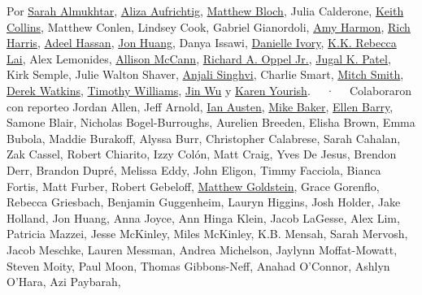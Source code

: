 Por \href{https://www.nytimes3xbfgragh.onion/by/sarah-almukhtar}{Sarah
Almukhtar},
\href{https://www.nytimes3xbfgragh.onion/by/aliza-aufrichtig}{Aliza
Aufrichtig},
\href{https://www.nytimes3xbfgragh.onion/by/matthew-bloch}{Matthew
Bloch}, Julia Calderone,
\href{https://www.nytimes3xbfgragh.onion/by/keith-collins}{Keith
Collins}, Matthew Conlen, Lindsey Cook, Gabriel Gianordoli,
\href{https://www.nytimes3xbfgragh.onion/by/amy-harmon}{Amy Harmon},
\href{https://www.nytimes3xbfgragh.onion/by/rich-harris}{Rich Harris},
\href{https://www.nytimes3xbfgragh.onion/by/adeel-hassan}{Adeel Hassan},
\href{https://www.nytimes3xbfgragh.onion/by/jon-huang}{Jon Huang}, Danya
Issawi,
\href{https://www.nytimes3xbfgragh.onion/by/danielle-ivory}{Danielle
Ivory}, \href{https://www.nytimes3xbfgragh.onion/by/kk-rebecca-lai}{K.K.
Rebecca Lai}, Alex Lemonides,
\href{https://www.nytimes3xbfgragh.onion/by/allison-mccann}{Allison
McCann},
\href{https://www.nytimes3xbfgragh.onion/by/richard-a-oppel-jr}{Richard
A. Oppel Jr.},
\href{https://www.nytimes3xbfgragh.onion/by/jugal-k-patel}{Jugal K.
Patel}, Kirk Semple, Julie Walton Shaver,
\href{https://www.nytimes3xbfgragh.onion/by/anjali-singhvi}{Anjali
Singhvi}, Charlie Smart,
\href{https://www.nytimes3xbfgragh.onion/by/mitch-smith}{Mitch Smith},
\href{https://www.nytimes3xbfgragh.onion/by/derek-watkins}{Derek
Watkins},
\href{https://www.nytimes3xbfgragh.onion/by/timothy-williams}{Timothy
Williams}, \href{https://www.nytimes3xbfgragh.onion/by/jin-wu}{Jin Wu} y
\href{https://www.nytimes3xbfgragh.onion/by/karen-yourish}{Karen
Yourish}. ~~·~~ Colaboraron con reporteo Jordan Allen, Jeff Arnold,
\href{https://www.nytimes3xbfgragh.onion/by/ian-austen}{Ian Austen},
\href{https://www.nytimes3xbfgragh.onion/by/mike-baker}{Mike Baker},
\href{https://www.nytimes3xbfgragh.onion/by/ellen-barry}{Ellen Barry},
Samone Blair, Nicholas Bogel-Burroughs, Aurelien Breeden, Elisha Brown,
Emma Bubola, Maddie Burakoff, Alyssa Burr, Christopher Calabrese, Sarah
Cahalan, Zak Cassel, Robert Chiarito, Izzy Colón, Matt Craig, Yves De
Jesus, Brendon Derr, Brandon Dupré, Melissa Eddy, John Eligon, Timmy
Facciola, Bianca Fortis, Matt Furber, Robert Gebeloff,
\href{https://www.nytimes3xbfgragh.onion/by/matthew-goldstein}{Matthew
Goldstein}, Grace Gorenflo, Rebecca Griesbach, Benjamin Guggenheim,
Lauryn Higgins, Josh Holder, Jake Holland, Jon Huang, Anna Joyce, Ann
Hinga Klein, Jacob LaGesse, Alex Lim, Patricia Mazzei, Jesse McKinley,
Miles McKinley, K.B. Mensah, Sarah Mervosh, Jacob Meschke, Lauren
Messman, Andrea Michelson, Jaylynn Moffat-Mowatt, Steven Moity, Paul
Moon, Thomas Gibbons-Neff, Anahad O'Connor, Ashlyn O'Hara, Azi Paybarah,
